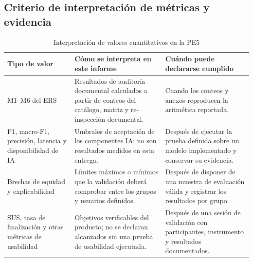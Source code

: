\documentclass[11pt,a4paper]{article}
\begin{document}
\subsection{Criterio de interpretación de métricas y evidencia}
\label{subsec:umbrales-ia}
\begin{center}
\end{center}
\begin{table}[H]\centering
	\caption{Interpretación de valores cuantitativos en la PE5}\label{tab:interpretacion-ia}
	\begin{tabularx}{\textwidth}{p{4.1cm}Y Y}\toprule
		\textbf{Tipo de valor}&\textbf{Cómo se interpreta en este informe}&\textbf{Cuándo puede declararse cumplido}\\\midrule
		M1--M6 del ERS&Resultados de auditoría documental calculados a partir de conteos del catálogo, matriz y re-inspección documental.&Cuando los conteos y anexos reproducen la aritmética reportada.\\
		F1, macro-F1, precisión, latencia y disponibilidad de IA&Umbrales de aceptación de los componentes IA; no son resultados medidos en esta entrega.&Después de ejecutar la prueba definida sobre un modelo implementado y conservar su evidencia.\\
		Brechas de equidad y explicabilidad&Límites máximos o mínimos que la validación deberá comprobar entre los grupos y usuarios definidos.&Después de disponer de una muestra de evaluación válida y registrar los resultados por grupo.\\
		SUS, tasa de finalización y otras métricas de usabilidad&Objetivos verificables del producto; no se declaran alcanzados sin una prueba de usabilidad ejecutada.&Después de una sesión de validación con participantes, instrumento y resultados documentados.\\\bottomrule
	\end{tabularx}
\end{table}
\end{document}
